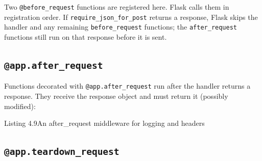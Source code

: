 \noindent{}Two \texttt{@before\_request} functions are registered here. Flask calls them in registration order. If \texttt{require\_json\_for\_post} returns a response, Flask skips the handler and any remaining \texttt{before\_request} functions; the \texttt{after\_request} functions still run on that response before it is sent.

\subsection*{\texorpdfstring{\texttt{@app.after\_request}}{@app.after\_request}}\label{04-request-handling-paths:appafter-request}

Functions decorated with \texttt{@app.after\_request} run after the handler returns a response. They receive the response object and must return it (possibly modified):

\begin{codeboxcap}[short]{\textcolor{accent}{Listing 4.9}\enspace An after\_request middleware for logging and headers}

\begin{Shaded}
\begin{Highlighting}[]
\OperatorTok{=}\OperatorTok{{-}}
    \NormalTok{(}\SpecialCharTok{\{}\SpecialCharTok{\}}\SpecialCharTok{\{}\OperatorTok{*} \NormalTok{)}

\NormalTok{    response.headers[}\NormalTok{] }\OperatorTok{=} \SpecialCharTok{\{}\OperatorTok{*} 
\end{Highlighting}
\end{Shaded}

\end{codeboxcap}

\subsection*{\texorpdfstring{\texttt{@app.teardown\_request}}{@app.teardown\_request}}\label{04-request-handling-paths:appteardown-request}

